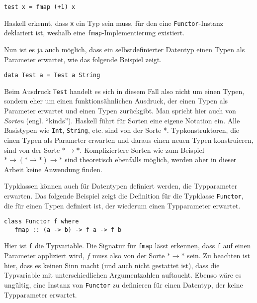 \begin{verbatim}
test x = fmap (+1) x
\end{verbatim}

Haskell erkennt, dass \texttt{x} ein Typ sein muss, für den eine \texttt{Functor}-Instanz deklariert ist, weshalb eine
\texttt{fmap}-Implementierung existiert.

Nun ist es ja auch möglich, dass ein selbstdefinierter Datentyp einen Typen als Parameter erwartet, wie das folgende Beispiel
zeigt.

\begin{verbatim}
data Test a = Test a String
\end{verbatim}

Beim Ausdruck \texttt{Test} handelt es sich in diesem Fall also nicht um einen Typen, sondern eher um einen funktionsähnlichen Ausdruck, der
einen Typen als Parameter erwartet und einen Typen zurückgibt. Man spricht hier auch von \textit{Sorten} (engl. ``kinds''). Haskell
führt für Sorten eine eigene Notation ein. Alle Basistypen wie \texttt{Int}, \texttt{String}, etc. sind von der Sorte *.
Typkonstruktoren, die einen Typen als Parameter erwarten und daraus einen neuen Typen konstruieren, sind von der Sorte
$* \rightarrow *$.
Kompliziertere Sorten wie zum Beispiel $* \rightarrow (* \rightarrow *) \rightarrow *$ sind theoretisch ebenfalls möglich,
werden aber in dieser Arbeit keine Anwendung finden.

Typklassen können auch für Datentypen definiert werden, die Typparameter erwarten. Das folgende Beispiel zeigt die
Definition für die Typklasse \texttt{Functor}, die für einen Typen definiert ist, der wiederum einen Typparameter erwartet.

\begin{verbatim}
class Functor f where
   fmap :: (a -> b) -> f a -> f b
\end{verbatim}

Hier ist \texttt{f} die Typvariable. Die Signatur für \texttt{fmap} lässt erkennen, dass \texttt{f} auf einen Parameter appliziert
wird, $f$ muss also von der Sorte $* \rightarrow *$ sein. Zu beachten ist hier, dass es keinen Sinn macht (und auch nicht
gestattet ist), dass die Typvariable mit unterschiedlichen Argumentzahlen auftaucht. Ebenso wäre es ungültig,
eine Instanz von \texttt{Functor} zu definieren für einen Datentyp, der keine Typparameter erwartet. 

